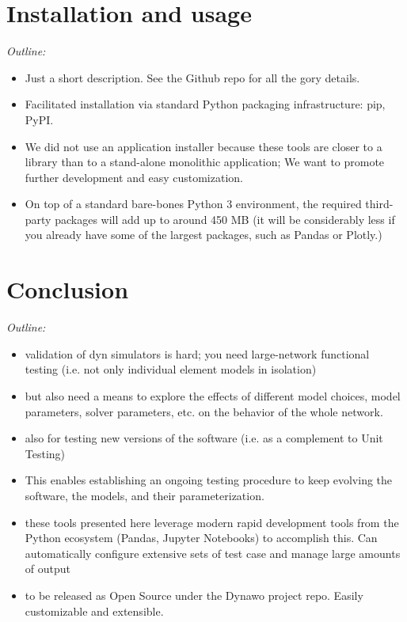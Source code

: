 \documentclass[conference]{IEEEtran}
\begin{document}
\section{Installation and usage}
\begin{center}
  \itshape Outline:
  \begin{itemize}
    \item Just a short description. See the Github repo for all the gory
          details.
    \item Facilitated installation via standard Python packaging
          infrastructure: pip, PyPI.
    \item We did not use an application installer because these tools are
          closer to a library than to a stand-alone monolithic application; We
          want to promote further development and easy customization.
    \item On top of a standard bare-bones Python 3 environment, the
          required third-party packages will add up to around 450 MB
          (it will be considerably less if you already have some of the
          largest packages, such as Pandas or Plotly.)
  \end{itemize}
\end{center}



\section{Conclusion}

\begin{center}
  \itshape Outline:
  \begin{itemize}
    \item validation of dyn simulators is hard; you need large-network
          functional testing (i.e. not only individual element models in isolation)
    \item but also need a means to explore the effects of different model
          choices, model parameters, solver parameters, etc. on the behavior
          of the whole network.
    \item also for testing new versions of the software (i.e. as a
          complement to Unit Testing)
    \item This enables establishing an ongoing testing procedure to keep
          evolving the software, the models, and their parameterization.
    \item these tools presented here leverage modern rapid development
          tools from the Python ecosystem (Pandas, Jupyter Notebooks) to
          accomplish this. Can automatically configure extensive sets of test
          case and manage large amounts of output
    \item to be released as Open Source under the Dynawo project
          repo. Easily customizable and extensible.
  \end{itemize}
\end{center}
\end{document}

